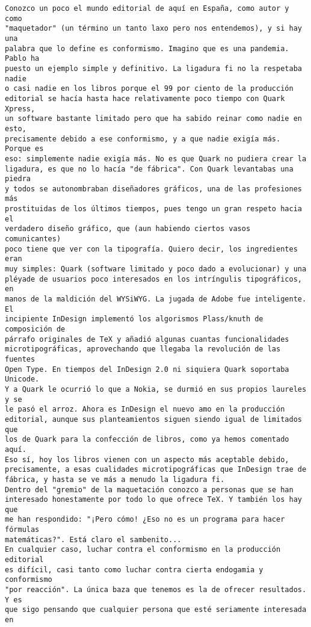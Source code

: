 \documentclass[a4paper,10pt]{article}
\begin{document}
\begin{lstlisting}
Conozco un poco el mundo editorial de aquí en España, como autor y como
"maquetador" (un término un tanto laxo pero nos entendemos), y si hay una
palabra que lo define es conformismo. Imagino que es una pandemia. Pablo ha
puesto un ejemplo simple y definitivo. La ligadura fi no la respetaba nadie
o casi nadie en los libros porque el 99 por ciento de la producción
editorial se hacía hasta hace relativamente poco tiempo con Quark Xpress,
un software bastante limitado pero que ha sabido reinar como nadie en esto,
precisamente debido a ese conformismo, y a que nadie exigía más. Porque es
eso: simplemente nadie exigía más. No es que Quark no pudiera crear la
ligadura, es que no lo hacía "de fábrica". Con Quark levantabas una piedra
y todos se autonombraban diseñadores gráficos, una de las profesiones más
prostituidas de los últimos tiempos, pues tengo un gran respeto hacia el
verdadero diseño gráfico, que (aun habiendo ciertos vasos comunicantes)
poco tiene que ver con la tipografía. Quiero decir, los ingredientes eran
muy simples: Quark (software limitado y poco dado a evolucionar) y una
pléyade de usuarios poco interesados en los intríngulis tipográficos, en
manos de la maldición del WYSiWYG. La jugada de Adobe fue inteligente. El
incipiente InDesign implementó los algorismos Plass/knuth de composición de
párrafo originales de TeX y añadió algunas cuantas funcionalidades
microtipográficas, aprovechando que llegaba la revolución de las fuentes
Open Type. En tiempos del InDesign 2.0 ni siquiera Quark soportaba Unicode.
Y a Quark le ocurrió lo que a Nokia, se durmió en sus propios laureles y se
le pasó el arroz. Ahora es InDesign el nuevo amo en la producción
editorial, aunque sus planteamientos siguen siendo igual de limitados que
los de Quark para la confección de libros, como ya hemos comentado aquí.
Eso sí, hoy los libros vienen con un aspecto más aceptable debido,
precisamente, a esas cualidades microtipográficas que InDesign trae de
fábrica, y hasta se ve más a menudo la ligadura fi.
Dentro del "gremio" de la maquetación conozco a personas que se han
interesado honestamente por todo lo que ofrece TeX. Y también los hay que
me han respondido: "¡Pero cómo! ¿Eso no es un programa para hacer fórmulas
matemáticas?". Está claro el sambenito...
En cualquier caso, luchar contra el conformismo en la producción editorial
es difícil, casi tanto como luchar contra cierta endogamia y conformismo
"por reacción". La única baza que tenemos es la de ofrecer resultados. Y es
que sigo pensando que cualquier persona que esté seriamente interesada en

\end{lstlisting}
\end{document}
